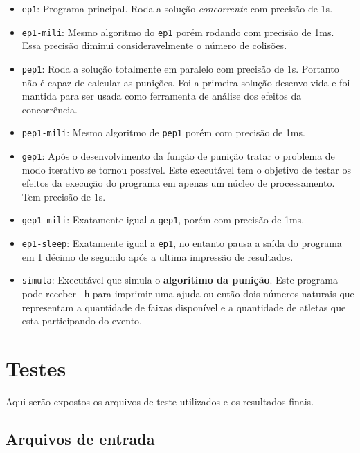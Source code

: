 \documentclass[12pt,a4paper]{article}
\begin{document}
\begin{itemize}
\item \verb+ep1+: Programa principal. Roda a solução \textit{concorrente} com precisão de 1s.
\item \verb+ep1-mili+: Mesmo algoritmo do \verb+ep1+ porém rodando com precisão de 1ms. Essa precisão diminui consideravelmente o número de colisões.
\item \verb+pep1+: Roda a solução totalmente em paralelo com precisão de 1s. Portanto não é capaz de calcular as punições. Foi a primeira solução desenvolvida e foi mantida para ser usada como ferramenta de análise dos efeitos da concorrência.
\item \verb+pep1-mili+: Mesmo algoritmo de \verb+pep1+ porém com precisão de 1ms.
\item \verb+gep1+: Após o desenvolvimento da função de punição tratar o problema de modo iterativo se tornou possível. Este executável tem o objetivo de testar os efeitos da execução do programa em apenas um núcleo de processamento. Tem precisão de 1s.
\item \verb+gep1-mili+: Exatamente igual a \verb+gep1+, porém com precisão de 1ms.
\item \verb+ep1-sleep+: Exatamente igual a \verb+ep1+, no entanto pausa a saída do programa em 1 décimo de segundo após a ultima impressão de resultados.
\item \verb+simula+: Executável que simula o \textbf{algoritimo da punição}. Este programa pode receber \verb+-h+ para imprimir uma ajuda ou então dois números naturais que representam a quantidade de faixas disponível e a quantidade de atletas que esta participando do evento.
\end{itemize}

\pagebreak
\section{Testes}
Aqui serão expostos os arquivos de teste utilizados e os resultados finais.
\subsection{Arquivos de entrada}
\end{document}
